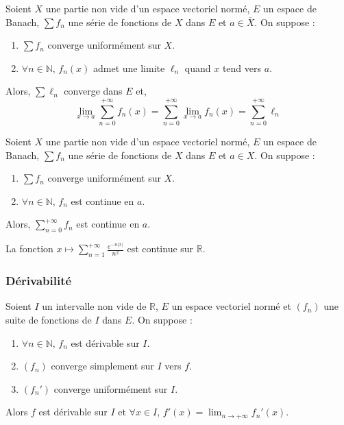 
  \begin{theorem}
    Soient $X$ une partie non vide d'un espace vectoriel normé, $E$ un espace de Banach, $\sum f_n$ une série de fonctions de $X$ dans $E$ et $a \in \overline{X}$. On suppose :
    \begin{enumerate}[label={\bfseries(\roman*)}]
      \item $\sum f_n$ converge uniformément sur $X$.
      \item $\forall n \in \mathbb{N}, \, f_n(x)$ admet une limite $\ell_n$ quand $x$ tend vers $a$.
    \end{enumerate}
    Alors, $\sum \ell_n$ converge dans $E$ et,
    \[ \lim_{x \rightarrow a} \sum_{n=0}^{+\infty} f_n(x) = \sum_{n=0}^{+\infty} \lim_{x \rightarrow a} f_n(x) = \sum_{n=0}^{+\infty} \ell_n \]
  \end{theorem}

  \begin{theorem}
    Soient $X$ une partie non vide d'un espace vectoriel normé, $E$ un espace de Banach, $\sum f_n$ une série de fonctions de $X$ dans $E$ et $a \in X$. On suppose :
    \begin{enumerate}[label={\bfseries(\roman*)}]
      \item $\sum f_n$ converge uniformément sur $X$.
      \item $\forall n \in \mathbb{N}, \, f_n$ est continue en $a$.
    \end{enumerate}
    Alors, $\sum_{n=0}^{+\infty} f_n$ est continue en $a$.
  \end{theorem}

  \begin{example}
    La fonction $x \mapsto \sum_{n=1}^{+\infty} \frac{e^{-n\vert x \vert}}{n^2}$ est continue sur $\mathbb{R}$.
  \end{example}

  \subsubsection{Dérivabilité}


  \begin{theorem}
    Soient $I$ un intervalle non vide de $\mathbb{R}$, $E$ un espace vectoriel normé et $(f_n)$ une suite de fonctions de $I$ dans $E$. On suppose :
    \begin{enumerate}[label={\bfseries(\roman*)}]
      \item $\forall n \in \mathbb{N}, \, f_n$ est dérivable sur $I$.
      \item $(f_n)$ converge simplement sur $I$ vers $f$.
      \item $(f_n')$ converge uniformément sur $I$.
    \end{enumerate}
    Alors $f$ est dérivable sur $I$ et $\forall x \in I$, $f'(x) = \lim_{n \rightarrow +\infty} f_n'(x)$.
  \end{theorem}

